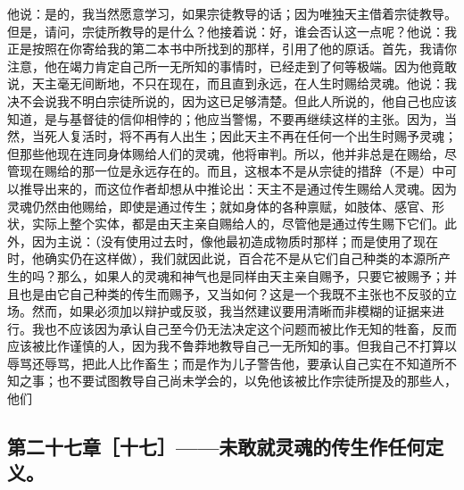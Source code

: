 他说：是的，我当然愿意学习，如果宗徒教导的话；因为唯独天主借着宗徒教导。但是，请问，宗徒所教导的是什么？他接着说：好，谁会否认这一点呢？他说：我正是按照在你寄给我的第二本书中所找到的那样，引用了他的原话。首先，我请你注意，他在竭力肯定自己所一无所知的事情时，已经走到了何等极端。因为他竟敢说，天主毫无间断地，不只在现在，而且直到永远，在人生时赐给灵魂。他说：我决不会说我不明白宗徒所说的，因为这已足够清楚。但此人所说的，他自己也应该知道，是与基督徒的信仰相悖的；他应当警惕，不要再继续这样的主张。因为，当然，当死人复活时，将不再有人出生；因此天主不再在任何一个出生时赐予灵魂；但那些他现在连同身体赐给人们的灵魂，他将审判。所以，他并非总是在赐给，尽管现在赐给的那一位是永远存在的。而且，这根本不是从宗徒的措辞（不是）中可以推导出来的，而这位作者却想从中推论出：天主不是通过传生赐给人灵魂。因为灵魂仍然由他赐给，即使是通过传生；就如身体的各种禀赋，如肢体、感官、形状，实际上整个实体，都是由天主亲自赐给人的，尽管他是通过传生赐下它们。此外，因为主说：（没有使用过去时，像他最初造成物质时那样；而是使用了现在时，他确实仍在这样做），我们就因此说，百合花不是从它们自己种类的本源所产生的吗？那么，如果人的灵魂和神气也是同样由天主亲自赐予，只要它被赐予；并且也是由它自己种类的传生而赐予，又当如何？这是一个我既不主张也不反驳的立场。然而，如果必须加以辩护或反驳，我当然建议要用清晰而非模糊的证据来进行。我也不应该因为承认自己至今仍无法决定这个问题而被比作无知的牲畜，反而应该被比作谨慎的人，因为我不鲁莽地教导自己一无所知的事。但我自己不打算以辱骂还辱骂，把此人比作畜生；而是作为儿子警告他，要承认自己实在不知道所不知之事；也不要试图教导自己尚未学会的，以免他该被比作宗徒所提及的那些人，他们\par


\subsection{第二十七章［十七］——未敢就灵魂的传生作任何定义。}


